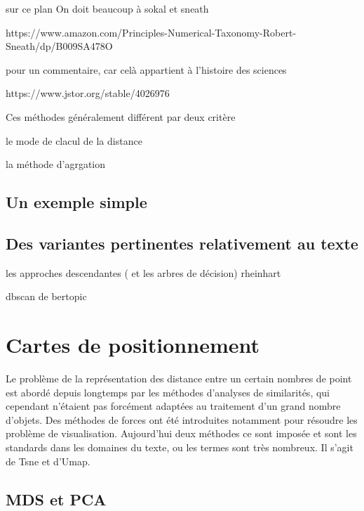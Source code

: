 \documentclass[
  letterpaper,
  DIV=11,
  numbers=noendperiod]{scrreprt}
\begin{document}
sur ce plan On doit beaucoup à sokal et sneath

https://www.amazon.com/Principles-Numerical-Taxonomy-Robert-Sneath/dp/B009SA478O

pour un commentaire, car celà appartient à l'histoire des sciences

https://www.jstor.org/stable/4026976

Ces méthodes généralement différent par deux critère

le mode de clacul de la distance

la méthode d'agrgation

\subsection{Un exemple simple}\label{un-exemple-simple}

\subsection{Des variantes pertinentes relativement au
texte}\label{des-variantes-pertinentes-relativement-au-texte}

les approches descendantes ( et les arbres de décision) rheinhart

dbscan de bertopic

\section{Cartes de positionnement}\label{cartes-de-positionnement}

Le problème de la représentation des distance entre un certain nombres
de point est abordé depuis longtemps par les méthodes d'analyses de
similarités, qui cependant n'étaient pas forcément adaptées au
traitement d'un grand nombre d'objets. Des méthodes de forces ont été
introduites notamment pour résoudre les problème de visualisation.
Aujourd'hui deux méthodes ce sont imposée et sont les standards dans les
domaines du texte, ou les termes sont très nombreux. Il s'agit de Tsne
et d'Umap.

\subsection{MDS et PCA}\label{mds-et-pca}
\end{document}
